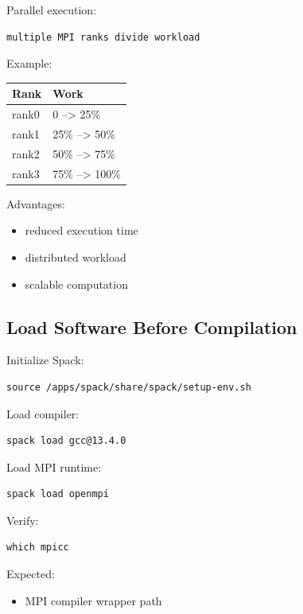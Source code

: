 \documentclass[11pt]{article}
\begin{document}
Parallel execution:

\begin{verbatim}
multiple MPI ranks divide workload
\end{verbatim}

Example:

\begin{center}
\begin{tabular}{ll}
Rank & Work\\
\hline
rank0 & 0 --> 25\%\\
rank1 & 25\% --> 50\%\\
rank2 & 50\% --> 75\%\\
rank3 & 75\% --> 100\%\\
\end{tabular}
\end{center}

Advantages:

\begin{itemize}
\item reduced execution time
\item distributed workload
\item scalable computation
\end{itemize}
\subsection{Load Software Before Compilation}
\label{sec:org51356ea}

Initialize Spack:

\begin{verbatim}
source /apps/spack/share/spack/setup-env.sh
\end{verbatim}

Load compiler:

\begin{verbatim}
spack load gcc@13.4.0
\end{verbatim}

Load MPI runtime:

\begin{verbatim}
spack load openmpi
\end{verbatim}

Verify:

\begin{verbatim}
which mpicc
\end{verbatim}

Expected:
\begin{itemize}
\item MPI compiler wrapper path
\end{itemize}
\end{document}
